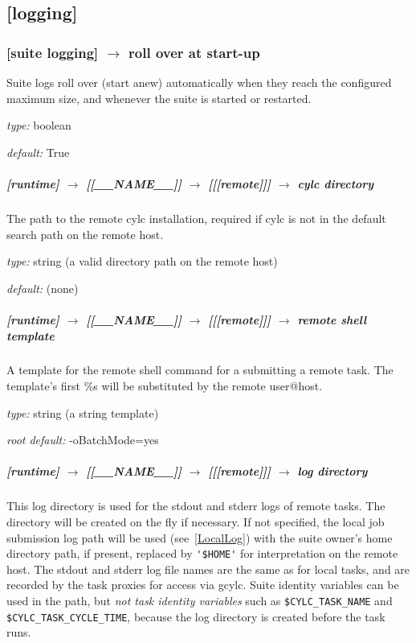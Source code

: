 \subsection{[logging]}

\subsubsection[roll over at start-up]{[suite logging] $\rightarrow$ roll over at start-up}

Suite logs roll over (start anew) automatically when they reach the
configured maximum size, and whenever the suite is started or restarted.

\begin{myitemize}
    \item {\em type:} boolean
    \item {\em default:} True
\end{myitemize}


\subparagraph[cylc directory]{[runtime] $\rightarrow$ [[\_\_NAME\_\_]] $\rightarrow$ [[[remote]]] $\rightarrow$ cylc directory}

The path to the remote cylc installation, required if cylc
is not in the default search path on the remote host.

\begin{myitemize}
\item {\em type:} string (a valid directory path on the remote host)
\item {\em default:} (none)
\end{myitemize}

\subparagraph[remote shell template]{[runtime] $\rightarrow$ [[\_\_NAME\_\_]] $\rightarrow$ [[[remote]]] $\rightarrow$ remote shell template }

A template for the remote shell command for a submitting a remote task.
The template's first \%s will be substituted by the remote user@host.

\begin{myitemize}
\item {\em type:} string (a string template)
\item {\em root default:} \lstinline@ssh -oBatchMode=yes %s@
\end{myitemize}

\subparagraph[log directory]{[runtime] $\rightarrow$ [[\_\_NAME\_\_]] $\rightarrow$ [[[remote]]] $\rightarrow$ log directory }

This log directory is used for the stdout and stderr logs of remote
tasks. The directory will be created on the fly if necessary. If not
specified, the local job submission log path will be used
(see~\ref{LocalLog}) with the
suite owner's home directory path, if present, replaced by
\lstinline='$HOME'= for interpretation on the remote host. The stdout
and stderr log file names are the same as for local tasks, and are
recorded by the task proxies for access via gcylc. Suite identity
variables can be used in the path, but {\em not task identity variables}
such as \lstinline=$CYLC_TASK_NAME= and \lstinline=$CYLC_TASK_CYCLE_TIME=, 
because the log directory is created before the task runs.

